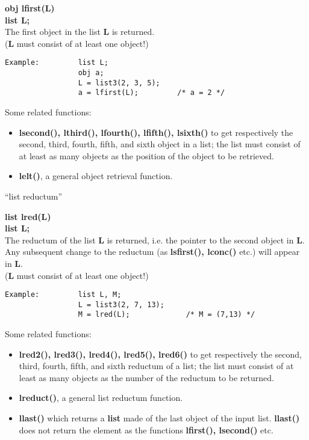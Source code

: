 {\bf obj lfirst(L)\\
list L;}\\[2ex]
The first object in the list {\bf L} is returned.\\
({\bf L} must consist of at least one object!)

\begin{verbatim}
Example:         list L;
                 obj a;
                 L = list3(2, 3, 5);
                 a = lfirst(L);         /* a = 2 */
\end{verbatim}

Some related functions:

\begin{itemize}
\item[] {\bf lsecond(), lthird(), lfourth(), lfifth(), lsixth()} to get respectively the second,
third, fourth, fifth, and sixth object in a list; the list must consist of at least as many objects
as the position of the object to be retrieved.
\item[] {\bf lelt()}, a general object retrieval function.
\end{itemize}

\leer
\begin{center} ``list reductum'' \end{center}
{\bf list lred(L)\\
list L;}\\[2ex]
The reductum of the list {\bf L} is returned, i.e. the pointer to the second object in {\bf L}.
Any subsequent change to the reductum (as {\bf lsfirst(), lconc()} etc.) will appear in {\bf L}.\\
({\bf L} must consist of at least one object!)

\begin{verbatim}
Example:         list L, M;
                 L = list3(2, 7, 13);
                 M = lred(L);             /* M = (7,13) */
\end{verbatim}

Some related functions:

\begin{itemize}
\item[] {\bf lred2(), lred3(), lred4(), lred5(), lred6()} to get respectively the second, third, fourth,
fifth, and sixth reductum of a list; the list must consist of at least as many objects as the
number of the reductum to be returned.
\item[] {\bf lreduct()}, a general list reductum function.
\item[] {\bf llast()} which returns a {\bf list} made of the last object of the input list. {\bf llast()} does not return the element as the functions {\bf lfirst(), lsecond()} etc.
\end{itemize}

